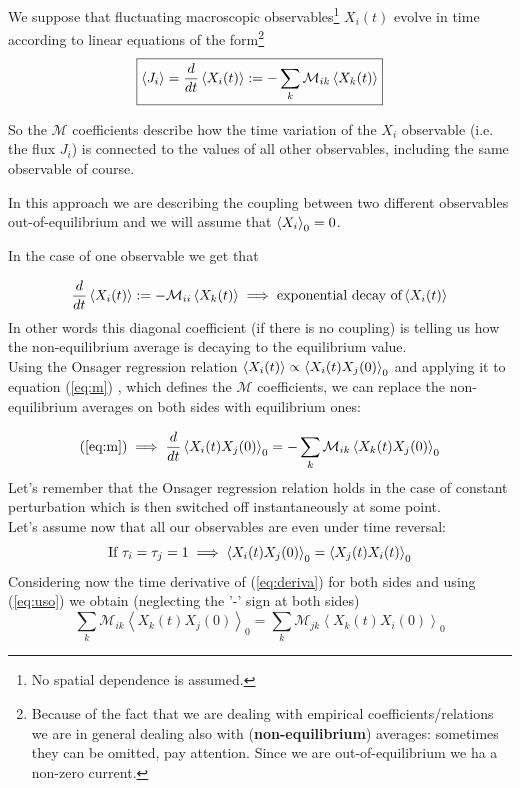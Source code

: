 \documentclass[\main/main.tex]{subfiles}
\begin{document}
We suppose that fluctuating macroscopic observables\footnote{No spatial dependence is assumed.} $X_i(t)$ evolve in time according to linear equations of the form\footnote{Because of the fact that we are dealing with empirical coefficients/relations we are in general dealing also with (\textbf{non-equilibrium}) averages: sometimes they can be omitted, pay attention. Since we are out-of-equilibrium we ha a non-zero current.}
\begin{equation}
\boxed{\left\langle J_{i} \right\rangle=\frac{d}{d t} \left\langle X_{i}(t) \right\rangle:=-\sum_{k} \mathcal{M}_{i k} \left\langle X_{k}(t) \right\rangle}
\label{eq:m}
\end{equation}

So the $\mathcal{M}$ coefficients describe how the time variation of the $X_i$ observable (i.e. the flux $J_i$) is connected to the values of all other observables, including the same observable of course.

In this approach we are describing the coupling between two different observables out-of-equilibrium and we will assume that $\left\langle X_i \right\rangle_0=0$.

In the case of one observable we get that

\begin{equation}
    \frac{d}{d t} \left\langle X_{i}(t) \right\rangle:=-\mathcal{M}_{i i} \left\langle X_{k}(t)  \right\rangle\implies \text{exponential decay of} \left\langle X_i(t) \right\rangle
\end{equation}
In other words this diagonal coefficient (if there is no coupling) is telling us how the non-equilibrium average is decaying to the equilibrium value. \\

Using the Onsager regression relation $\left\langle X_i(t) \right\rangle \propto \left\langle X_i(t)X_j(0) \right\rangle_0$ and applying it to equation (\ref{eq:m}) , which defines the $\mathcal{M}$ coefficients, we can replace the non-equilibrium averages on both sides with equilibrium ones:

\begin{equation}
    (\ref{eq:m}) \implies
\frac{d}{d t}\left\langle X_{i}(t) X_{j}(0)\right\rangle_{0}=-\sum_{k} \mathcal{M}_{i k}\left\langle X_{k}(t) X_{j}(0)\right\rangle_0
\label{eq:uso}
\end{equation}
Let's remember that the Onsager regression relation holds in the case of constant perturbation which is then switched off instantaneously at some point. \\

Let's assume now that all our observables are even under time reversal:
\begin{equation}
    \text{If} \,\,\tau_i=\tau_j=1  \implies \left\langle X_i(t)X_j(0) \right\rangle_0=\left\langle X_j(t)X_i(t) \right\rangle_0
    \label{eq:deriva}
\end{equation}
Considering now the time derivative of (\ref{eq:deriva}) for both sides and using (\ref{eq:uso}) we obtain (neglecting the '-' sign at both sides)
\begin{equation}
\sum_{k} \mathcal{M}_{i k}\left\langle X_{k}(t) X_{j}(0)\right\rangle_{0}=\sum_{k} \mathcal{M}_{j k}\left\langle X_{k}(t) X_{i}(0)\right\rangle_{0}
\label{eq:altralabel}
\end{equation}
\end{document}

